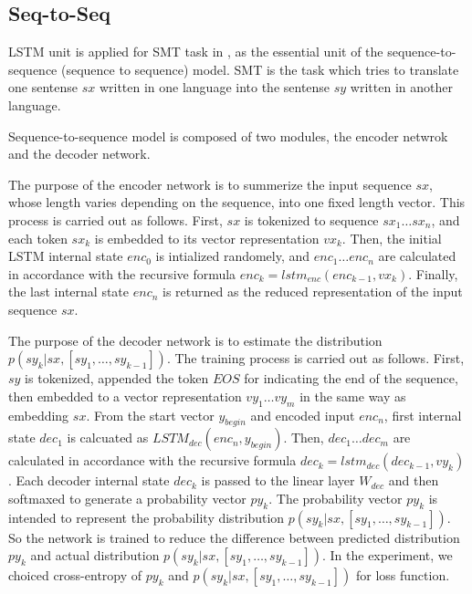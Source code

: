 \documentclass[senior,final,11pt]{iscs-thesis}
\begin{document}
\subsection{Seq-to-Seq}

LSTM unit is applied for SMT task in \cite{seq2seq}, as the essential unit of the sequence-to-sequence (sequence to sequence) model.
SMT is the task which tries to translate one sentense $sx$ written in one language into the sentense $sy$ written in another language.

Sequence-to-sequence model is composed of two modules, the encoder netwrok and the decoder network.

The purpose of the encoder network is to summerize the input sequence $sx$, whose length varies depending on the sequence, into one fixed length vector.
This process is carried out as follows. 
First, $sx$ is tokenized to sequence $sx_{1} \dots sx_{n}$, and each token $sx_{k}$ is embedded to its vector representation $vx_{k}$. 
Then, the initial LSTM internal state $enc_0$ is intialized randomely, 
and $ enc_{1} \dots enc_{n} $ are calculated in accordance with the recursive formula $ enc_{k} = lstm_{enc}(enc_{k-1},vx_{k}) $.
Finally, the last internal state $ enc_{n}$ is returned as the reduced representation of the input sequence $sx$.

The purpose of the decoder network is to estimate the distribution $ p(sy_k|sx,[sy_1,\dots,sy_{k-1}]) $. 
The training process is carried out as follows. 
First, $sy$ is tokenized, appended the token $ EOS $ for indicating the end of the sequence, then embedded to a vector representation $vy_{1} \dots vy_{m}$ in the same way as embedding $sx$.
From the start vector $y_{begin}$ and encoded input $ enc_{n} $, first internal state $ dec_{1}$ is calcuated as $ LSTM_{dec}(enc_{n},y_{begin}) $.
Then, $ dec_{1} \dots dec_{m} $ are calculated in accordance with the recursive formula $ dec_{k} = lstm_{dec}(dec_{k-1},vy_{k}) $.
Each decoder internal state $ dec_{k} $ is passed to the linear layer $ W_{dec} $ and then softmaxed to generate a probability vector $ py_{k} $.
The probability vector $ py_{k} $ is intended to represent the probability distribution $ p(sy_k|sx,[sy_1,\dots,sy_{k-1}]) $.
So the network is trained to reduce the difference between predicted distribution $ py_{k} $ and actual distribution $ p(sy_k|sx,[sy_1,\dots,sy_{k-1}]) $.
In the experiment, we choiced cross-entropy of $ py_{k} $ and $ p(sy_k|sx,[sy_1,\dots,sy_{k-1}]) $ for loss function.
\end{document}
